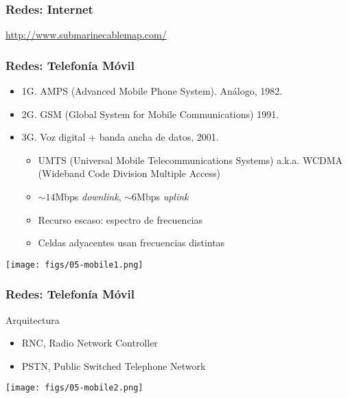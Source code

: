\documentclass[letter]{beamer}
\begin{document}
\begin{frame}
  \frametitle{Redes: Internet}

  \url{http://www.submarinecablemap.com/}

\end{frame}

\begin{frame}
  \frametitle{Redes: Telefonía Móvil}

  \begin{itemize}
    \item 1G. AMPS (Advanced Mobile Phone System). Análogo, 1982.
    \item 2G. GSM (Global System for Mobile Communications) 1991.
    \item 3G. Voz digital + banda ancha de datos, 2001.
      \begin{itemize}
        \item UMTS (Universal Mobile Telecommunications Systems)
              a.k.a. WCDMA (Wideband Code Division Multiple Access)
        \item $\sim 14$Mbps {\em downlink}, $\sim 6$Mbps {\em uplink}
        \item Recurso escaso: espectro de frecuencias
        \item Celdas adyacentes usan frecuencias distintas
      \end{itemize}
  \end{itemize}
  
  \begin{center}
    \texttt{[image: figs/05-mobile1.png]}
  \end{center}

\end{frame}

\begin{frame}
  \frametitle{Redes: Telefonía Móvil}

  Arquitectura
  \begin{itemize}
    \item RNC, Radio Network Controller
    \item PSTN, Public Switched Telephone Network
  \end{itemize}
  \begin{center}
    \texttt{[image: figs/05-mobile2.png]}
  \end{center}

\end{frame}
\end{document}
